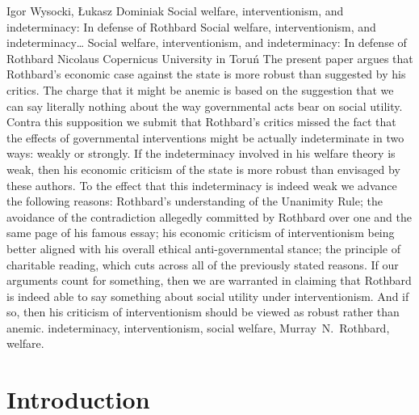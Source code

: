 \begin{artengenv}{Igor Wysocki, Łukasz Dominiak}
	{Social welfare, interventionism, and indeterminacy: In defense of Rothbard}
	{Social welfare, interventionism, and indeterminacy\ldots}
	{Social welfare, interventionism, and indeterminacy: In defense of\\Rothbard}
	{Nicolaus Copernicus University in Toruń\label{wysocki-first}}
	{The present paper argues that Rothbard's economic case against the state is more robust than suggested by his critics. The charge that it might be anemic is based on the suggestion that we can say literally nothing about the way governmental acts bear on social utility. Contra this supposition we submit that Rothbard's critics missed the fact that the effects of governmental interventions might be actually indeterminate in two ways: weakly or strongly. If the indeterminacy involved in his welfare theory is weak, then his economic criticism of the state is more robust than envisaged by these authors. To the effect that this indeterminacy is indeed weak we advance the following reasons: Rothbard's understanding of the Unanimity Rule; the avoidance of the contradiction allegedly committed by Rothbard over one and the same page of his famous essay; his economic criticism of interventionism being better aligned with his overall ethical anti-governmental stance; the principle of charitable reading, which cuts across all of the previously stated reasons. If our arguments count for something, then we are warranted in claiming that Rothbard is indeed able to say something about social utility under interventionism. And if so, then his criticism of interventionism should be viewed as robust rather than anemic.
	}
	{indeterminacy, interventionism, social welfare, Murray~N.~Rothbard, welfare.}



\section{Introduction}


\end{artengenv}
